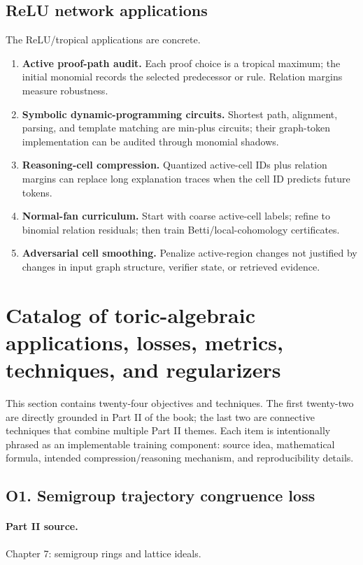 \documentclass[11pt]{article}
\theoremstyle{definition}
\begin{document}
\subsection{ReLU network applications}
The ReLU/tropical applications are concrete.
\begin{enumerate}[leftmargin=*]
\item \textbf{Active proof-path audit.}  Each proof choice is a tropical maximum; the initial monomial records the selected predecessor or rule.  Relation margins measure robustness.
\item \textbf{Symbolic dynamic-programming circuits.}  Shortest path, alignment, parsing, and template matching are min-plus circuits; their graph-token implementation can be audited through monomial shadows.
\item \textbf{Reasoning-cell compression.}  Quantized active-cell IDs plus relation margins can replace long explanation traces when the cell ID predicts future tokens.
\item \textbf{Normal-fan curriculum.}  Start with coarse active-cell labels; refine to binomial relation residuals; then train Betti/local-cohomology certificates.
\item \textbf{Adversarial cell smoothing.}  Penalize active-region changes not justified by changes in input graph structure, verifier state, or retrieved evidence.
\end{enumerate}

\section{Catalog of toric-algebraic applications, losses, metrics, techniques, and regularizers}
This section contains twenty-four objectives and techniques.  The first twenty-two are directly grounded in Part II of the book; the last two are connective techniques that combine multiple Part II themes.  Each item is intentionally phrased as an implementable training component: source idea, mathematical formula, intended compression/reasoning mechanism, and reproducibility details.

\subsection{O1. Semigroup trajectory congruence loss}
\paragraph{Part II source.} Chapter 7: semigroup rings and lattice ideals.
\end{document}

